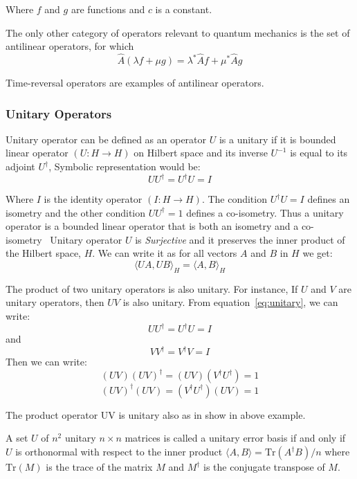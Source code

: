 Where $f$ and $g$ are functions and $c$ is a constant.

The only other category of operators relevant to quantum mechanics is the set of antilinear operators, for which
\begin{equation}
  \hat{A}(\lambda f + \mu g) = \lambda^{*}\hat{A}f + \mu^{*}\hat{A}g
  \label{eq:antilinear}
\end{equation}

Time-reversal operators are examples of antilinear operators.


\subsubsection{Unitary Operators}
Unitary operator can be defined as an operator $U$ is a unitary if it is bounded linear operator $( U : H \rightarrow H )$ on Hilbert space and its inverse $U^{-1}$ is equal to its adjoint $U^{\dagger}$, Symbolic representation would be:
\begin{equation}
  UU^{\dagger} = U^{\dagger}U = I
  \label{eq:unitary}
\end{equation}

Where $I$ is the identity operator $(I: H \rightarrow H)$. The condition $U^{\dagger}U = I$ defines an isometry and the other condition $UU^{\dagger} = 1$ defines a co-isometry. Thus a unitary operator is a bounded linear operator that is both an isometry and a co-isometry~\cite{halmos2012hilbertspaceproblem} Unitary operator $U$ is \textit{Surjective} and it preserves the inner product of the Hilbert space, $H$. We can write it as for all vectors $A$ and $B$ in $H$ we get: $$\langle UA, UB \rangle_{H} = \langle A, B \rangle_{H}$$

The product of two unitary operators is also unitary. For instance, If $U$ and $V$ are unitary operators, then $UV$ is also unitary. From equation~\ref{eq:unitary}, we can write: $$ UU^{\dagger} = U^{\dagger}U = I$$ and $$ VV^{\dagger} = V^{\dagger}V = I$$ Then we can write:
  $$(UV)(UV)^{\dagger} = (UV)(V^{\dagger}U^{\dagger}) = 1$$
  $$(UV)^{\dagger}(UV) = (V^{\dagger}U^{\dagger})(UV) = 1$$

The product operator UV is unitary also as in show in above example.


\begin{definition}
A set $U$ of $n^2$ unitary $n \times n$ matrices is called a unitary error basis if and only if $U$ is orthonormal with respect to the inner product $\langle A, B \rangle = {\textrm{Tr}(A^\dagger B)} / n$ where $\textrm{Tr}(M)$ is the trace of the matrix $M$ and $M^\dagger$ is the conjugate transpose of $M$.
\end{definition}

